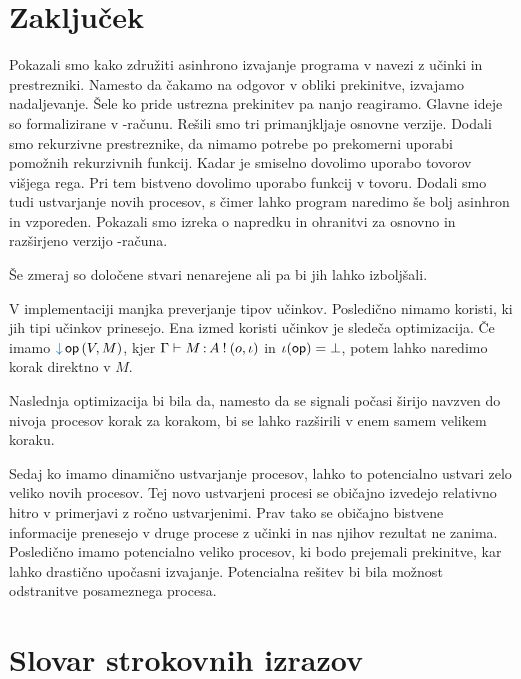 \section{Zaključek}

Pokazali smo kako združiti asinhrono izvajanje programa v navezi z učinki in prestrezniki. Namesto da čakamo na odgovor v obliki prekinitve, izvajamo nadaljevanje. Šele ko pride ustrezna prekinitev pa nanjo reagiramo. Glavne ideje so formalizirane v \lae-računu. Rešili smo tri primanjkljaje osnovne verzije. Dodali smo rekurzivne prestreznike, da nimamo potrebe po prekomerni uporabi pomožnih rekurzivnih funkcij. Kadar je smiselno dovolimo uporabo tovorov višjega rega. Pri tem bistveno dovolimo uporabo funkcij v tovoru. Dodali smo tudi ustvarjanje novih procesov, s čimer lahko program naredimo še bolj asinhron in vzporeden. Pokazali smo izreka o napredku in ohranitvi za osnovno in razširjeno verzijo \lae-računa.

Še zmeraj so določene stvari nenarejene ali pa bi jih lahko izboljšali.

V implementaciji manjka preverjanje tipov učinkov. Posledično nimamo koristi, ki jih tipi učinkov prinesejo. Ena izmed koristi učinkov je sledeča optimizacija. Če imamo $\tmopin{op}{V}{M}$, kjer $\Gamma \vdash M \mathinner{:} A \mathbin{!} (o, \iota)$ in $\iota(\mathsf{op}) = \bot$, potem lahko naredimo korak direktno v $M$. 

Naslednja optimizacija bi bila da, namesto da se signali počasi širijo navzven do nivoja procesov korak za korakom, bi se lahko razširili v enem samem velikem koraku.

Sedaj ko imamo dinamično ustvarjanje procesov, lahko to potencialno ustvari zelo veliko novih procesov. Tej novo ustvarjeni procesi se običajno izvedejo relativno hitro v primerjavi z ročno ustvarjenimi. Prav tako se običajno bistvene informacije prenesejo v druge procese z učinki in nas njihov rezultat ne zanima. Posledično imamo potencialno veliko procesov, ki bodo prejemali prekinitve, kar lahko drastično upočasni izvajanje. Potencialna rešitev bi bila možnost odstranitve posameznega procesa.

\section*{Slovar strokovnih izrazov}





